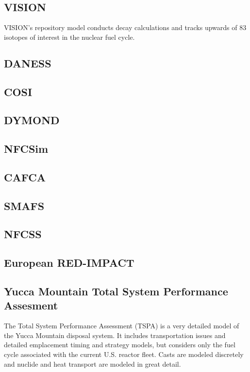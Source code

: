 \subsection{VISION}
VISION's repository model conducts decay calculations and tracks 
upwards of 83 isotopes of interest in the nuclear fuel cycle.  
\cite{yacout_visionverifiable_2006} 

\subsection{DANESS}

\subsection{COSI}

\subsection{DYMOND}

\subsection{NFCSim}

\subsection{CAFCA}

\subsection{SMAFS}

\subsection{NFCSS}

\subsection{European RED-IMPACT}

\subsection{Yucca Mountain Total System Performance Assesment}
The Total System Performance Assessment (TSPA) is a very detailed 
model of the Yucca Mountain disposal system. It includes 
transportation issues and detailed emplacement timing and strategy 
models, but considers only the fuel cycle associated with the current  
U.S. reactor fleet. Casts are modeled discretely and nuclide and heat 
transport are modeled in great detail. 

